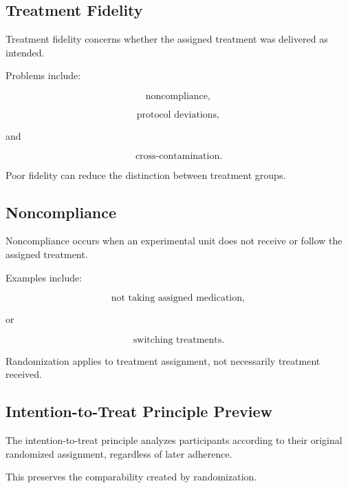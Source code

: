 \subsection{Treatment Fidelity}
\label{subsec:treatment-fidelity}

Treatment fidelity concerns whether the assigned treatment was delivered
as intended.

Problems include:

\[
\boxed{
\text{noncompliance},
}
\]

\[
\boxed{
\text{protocol deviations},
}
\]

and

\[
\boxed{
\text{cross-contamination}.
}
\]

Poor fidelity can reduce the distinction between treatment groups.

\subsection{Noncompliance}
\label{subsec:experimental-noncompliance}

Noncompliance occurs when an experimental unit does not receive or follow
the assigned treatment.

Examples include:

\[
\boxed{
\text{not taking assigned medication},
}
\]

or

\[
\boxed{
\text{switching treatments}.
}
\]

Randomization applies to treatment assignment, not necessarily treatment
received.

\subsection{Intention-to-Treat Principle Preview}
\label{subsec:intention-to-treat-preview}

The intention-to-treat principle analyzes participants according to their
original randomized assignment, regardless of later adherence.

This preserves the comparability created by randomization.

